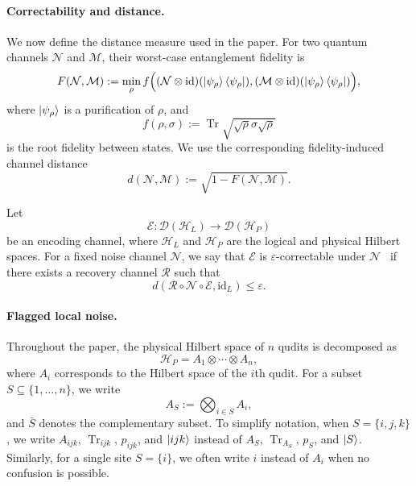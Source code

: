\documentclass[10pt,twocolumn,superscriptaddress,aps,amsmath,amssymb,citeautoscript,floatfix,prx,longbibliography]{revtex4-2}
\theoremstyle{plain}
\theoremstyle{plain}
\theoremstyle{plain}
\theoremstyle{plain}
\theoremstyle{plain}
\theoremstyle{plain}
\begin{document}
\paragraph{Correctability and distance.} 
We now define the distance measure used in the paper. For two quantum channels $\mathcal N$ and $\mathcal M$, their worst-case entanglement fidelity is
$$
\begin{aligned}
F(\mathcal N,\mathcal M)
:=
\min_\rho
f\Big(
(\mathcal N\otimes\mathrm{id})
(\ket{\psi_\rho}\bra{\psi_\rho}),
(\mathcal M\otimes\mathrm{id})
(\ket{\psi_\rho}\bra{\psi_\rho})
\Big),
\end{aligned}
$$
where $\ket{\psi_\rho}$ is a purification of $\rho$, and
$$
f(\rho,\sigma)
:=
\operatorname{Tr}
\sqrt{\sqrt\rho\sigma\sqrt\rho}
$$
is the root fidelity between states. We use the corresponding fidelity-induced channel distance
\begin{equation}\label{eq:distance_def}
d(\mathcal N,\mathcal M)
:=
\sqrt{1-F(\mathcal N,\mathcal M)} .
\end{equation}

Let
$$
\mathcal E:
\mathcal D(\mathcal H_L)
\to
\mathcal D(\mathcal H_P)
$$
be an encoding channel, where $\mathcal H_L$ and $\mathcal H_P$ are the logical and physical Hilbert spaces. For a fixed noise channel $\mathcal N$, we say that $\mathcal E$ is $\varepsilon$-correctable under $\mathcal N$~\cite{Beny2010} if there exists a recovery channel $\mathcal R$ such that
$$
d(\mathcal R\circ\mathcal N\circ\mathcal E,\mathrm{id}_L)
\le
\varepsilon .
$$

\paragraph{Flagged local noise.}

Throughout the paper, the physical Hilbert space of $n$ qudits is decomposed as
$$
    \mathcal H_P
    =
    A_1\otimes\cdots\otimes A_n,
$$
where $A_i$ corresponds to the Hilbert space of the $i$th qudit. For a subset $S\subseteq\{1,\ldots,n\}$, we write
$$
    A_S
    :=
    \bigotimes_{i\in S}A_i,
$$
and $\bar S$ denotes the complementary subset. To simplify notation, when $S=\{i,j,k\}$, we write $A_{ijk}$, $\operatorname{Tr}_{ijk}$, $p_{ijk}$, and $\ket{ijk}$ instead of $A_S$, $\operatorname{Tr}_{A_S}$, $p_S$, and $\ket S$. Similarly, for a single site $S=\{i\}$, we often write $i$ instead of $A_i$ when no confusion is possible.
\end{document}
